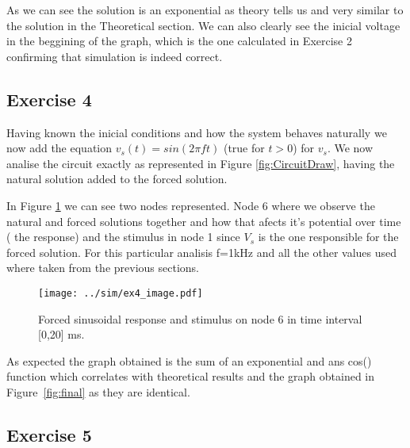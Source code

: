 As we can see the solution is an exponential as theory tells us and very similar to the solution in the Theoretical section. We can also clearly see the inicial voltage in the beggining of the graph, which is the one calculated in Exercise 2 confirming that simulation is indeed correct.

\subsection{Exercise 4} \label{sec:Ex4Sim}

Having known the inicial conditions and how the system behaves naturally we now add the equation $v_s(t)=sin(2 \pi f t)$ (true for $t>0$) for $v_s$. We now analise the circuit exactly as represented in Figure \ref{fig:CircuitDraw}, having the natural solution added to the forced solution.\par
In Figure \ref{fig:Ex4_Image} we can see two nodes represented. Node 6 where we observe the natural and forced solutions together and how that afects it's potential over time ( the response) and the stimulus in node 1 since $V_s$ is the one responsible for the forced solution. For this particular analisis f=1kHz and all the other values used where taken from the previous sections. 

\begin{figure}[H]
  \centering
  \texttt{[image: ../sim/ex4\_image.pdf]}
  \caption{Forced sinusoidal response and stimulus on node 6 in time interval [0,20] ms.}
  \label{fig:Ex4_Image}
\end{figure}


As expected the graph obtained is the sum of an exponential and ans cos() function which correlates with theoretical results and the graph obtained in Figure~\ref{fig:final} as they are identical.

\subsection{Exercise 5} \label{sec:Ex5Sim}

